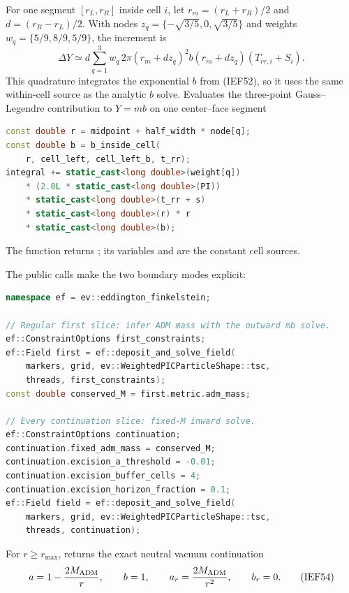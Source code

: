 For one segment \([r_L,r_R]\) inside cell \(i\), let
\(r_m=(r_L+r_R)/2\) and \(d=(r_R-r_L)/2\).  With nodes
\(z_q=\{-\sqrt{3/5},0,\sqrt{3/5}\}\) and weights
\(w_q=\{5/9,8/9,5/9\}\), the increment is
\[
 \Delta Y\simeq d\sum_{q=1}^3w_q\,
 2\pi(r_m+dz_q)^2 b(r_m+dz_q)(T_{rr,i}+S_i).
                                                        \tag{IEF53a}
\]
This quadrature integrates the exponential \(b\) from (IEF52), so it
uses the same within-cell source as the analytic \(b\) solve.
{}
{Evaluates the three-point Gauss--Legendre contribution to \(Y=mb\) on one center--face segment}
\begin{lstlisting}[language=C++,basicstyle=\ttfamily\scriptsize]
const double r = midpoint + half_width * node[q];
const double b = b_inside_cell(
    r, cell_left, cell_left_b, t_rr);
integral += static_cast<long double>(weight[q])
    * (2.0L * static_cast<long double>(PI))
    * static_cast<long double>(t_rr + s)
    * static_cast<long double>(r) * r
    * static_cast<long double>(b);
\end{lstlisting}
The function returns ; its variables
 and  are the constant cell sources.

The public calls make the two boundary modes explicit:
\begin{lstlisting}[language=C++,basicstyle=\ttfamily\scriptsize]
namespace ef = ev::eddington_finkelstein;

// Regular first slice: infer ADM mass with the outward mb solve.
ef::ConstraintOptions first_constraints;
ef::Field first = ef::deposit_and_solve_field(
    markers, grid, ev::WeightedPICParticleShape::tsc,
    threads, first_constraints);
const double conserved_M = first.metric.adm_mass;

// Every continuation slice: fixed-M inward solve.
ef::ConstraintOptions continuation;
continuation.fixed_adm_mass = conserved_M;
continuation.excision_a_threshold = -0.01;
continuation.excision_buffer_cells = 4;
continuation.excision_horizon_fraction = 0.1;
ef::Field field = ef::deposit_and_solve_field(
    markers, grid, ev::WeightedPICParticleShape::tsc,
    threads, continuation);
\end{lstlisting}

For \(r\ge r_{\max}\),  returns the exact neutral vacuum
continuation
\[
 a=1-\frac{2M_{\rm ADM}}r,\qquad b=1,\qquad
 a_r=\frac{2M_{\rm ADM}}{r^2},\qquad b_r=0.             \tag{IEF54}
\]

